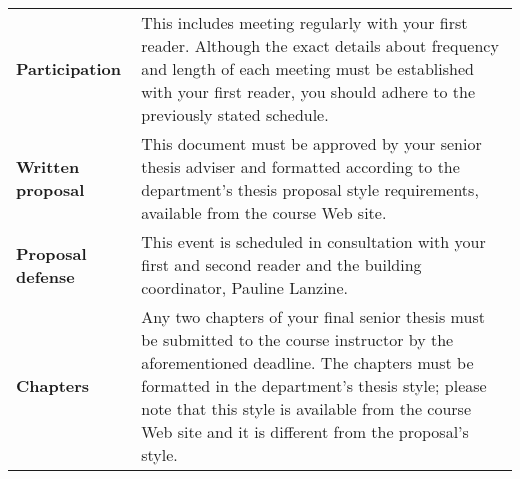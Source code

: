 %

\begin{center}
\begin{tabular}{lp{4in}}

\bf Participation & This includes meeting regularly with your first reader. Although the exact details about frequency and
length of each meeting must be established with your first reader, you should adhere to the previously stated schedule.
\\[.1in]

\bf Written proposal & This document must be approved by your senior thesis adviser and formatted according to the
department's thesis proposal style requirements, available from the course Web site. \\[.1in]

\bf Proposal defense & This event is scheduled in consultation with your first and second reader and the building
coordinator, Pauline Lanzine. \\[.1in]

\bf Chapters & Any two chapters of your final senior thesis must be submitted to the course instructor by the
aforementioned deadline.  The chapters must be formatted in the department's thesis style; please note that
this style is available from the course Web site and it is different from the proposal's style.

\end{tabular}
\end{center}




